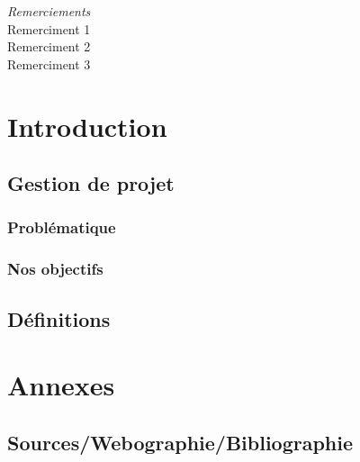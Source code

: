 \documentclass[a4paper,10pt,one side,titlepage]{report}
\begin{document}




\emph{\Large Remerciements}
\\[2cm]
Remerciment 1
\\[1cm]
Remerciment 2
\\[2cm]
Remerciment 3


\setcounter{tocdepth}{1}
\tableofcontents

\part{Introduction}
\chapter{Gestion de projet}
\section{Problématique}
\section{Nos objectifs}
\chapter{Définitions}
\part{Annexes}
\chapter{Sources/Webographie/Bibliographie}



\end{document}
